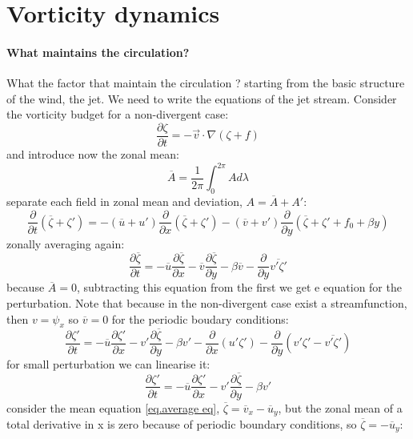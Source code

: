 \section{Vorticity dynamics}
\paragraph{What maintains the circulation?} What the factor that maintain the circulation ? starting from the basic structure of the wind, the jet. We need to write the equations of the jet stream. Consider the vorticity budget for a non-divergent case:
\begin{equation}
	\frac{\partial\zeta}{\partial t}=-\vec{v}\cdot\nabla(\zeta+f)
\end{equation}
and introduce now the zonal mean:
\begin{equation}\label{eq.zonal mean}
	\overline{A}=\frac{1}{2\pi}\int_0^{2\pi}Ad\lambda
\end{equation}
separate each field in zonal mean and deviation, $A=\overline{A}+A'$:
$$\frac{\partial}{\partial t}(\overline{\zeta}+\zeta')=-(\overline{u}+u')\frac{\partial}{\partial x}(\overline{\zeta}+\zeta')-(\overline{v}+v')\frac{\partial}{\partial y}(\overline{\zeta}+\zeta'+f_0+\beta y)$$
zonally averaging again:
\begin{equation}\label{eq.average eq}
	\frac{\partial\overline{\zeta}}{\partial t}=-\overline{u}\frac{
		\partial\overline{\zeta}
	}{\partial x}-\overline{v}\frac{\partial\overline{\zeta}}{\partial y}-\beta \overline{v}-\frac{\partial}{\partial y}\overline{v'\zeta'}
\end{equation}
because $\overline{A}=0$, subtracting this equation from the first we get e equation for the perturbation. Note that because in the non-divergent case exist a streamfunction, then $v=\psi_x$ so $\overline{v}=0$ for the periodic boudary conditions:
$$\frac{\partial\zeta'}{\partial t}=-\overline{u}\frac{\partial\zeta'}{\partial x}-v'\frac{\partial\overline{\zeta}}{\partial y}-\beta v'-\frac{\partial}{\partial x}(u'\zeta')-\frac{\partial}{\partial y}(v'\zeta'-\overline{v'\zeta'})$$ for small perturbation we can linearise it:
\begin{equation}
	\frac{\partial\zeta'}{\partial t}=-\overline{u}\frac{\partial\zeta'}{\partial x}-v'\frac{\partial\overline{\zeta}}{\partial y}-\beta v'
\end{equation}
consider the mean equation \ref{eq.average eq}, $\overline{\zeta}=\overline{v}_x-\overline{u}_y$, but the zonal mean of a total derivative in x is zero because of periodic boundary conditions, so $\overline{\zeta}=-\overline{u}_y$:
